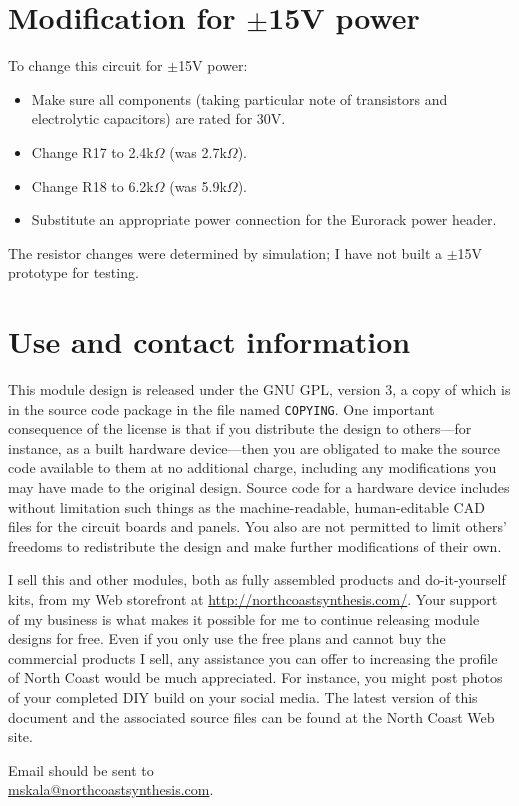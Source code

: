 \section{Modification for $\pm$15V power}

To change this circuit for $\pm$15V power:

\begin{itemize}
  \item Make sure all components (taking particular note of transistors
  and electrolytic capacitors) are rated for 30V.
  \item Change R17 to 2.4k$\Omega$ (was 2.7k$\Omega$).
  \item Change R18 to 6.2k$\Omega$ (was 5.9k$\Omega$).
  \item Substitute an appropriate power connection for the Eurorack power
  header.
\end{itemize}

The resistor changes were determined by simulation; I have not built a
$\pm$15V prototype for testing.

\section{Use and contact information}

This module design is released under the GNU GPL, version 3, a copy of which
is in the source code package in the file named \texttt{COPYING}.  One
important consequence of the license is that if you distribute the design to
others---for instance, as a built hardware device---then you are obligated
to make the source code available to them at no additional charge, including
any modifications you may have made to the original design.  Source code for
a hardware device includes without limitation such things as the
machine-readable, human-editable CAD files for the circuit boards and
panels.  You also are not permitted to limit others' freedoms to
redistribute the design and make further modifications of their own.

I sell this and other modules, both as fully assembled products and
do-it-yourself kits, from my Web storefront at
\url{http://northcoastsynthesis.com/}.  Your support of my business is what
makes it possible for me to continue releasing module designs for free. 
Even if you only use the free plans and cannot buy the commercial products I
sell, any assistance you can offer to increasing the profile of North Coast
would be much appreciated.  For instance, you might post photos of your
completed DIY build on your social media.  The latest version of this
document and the associated source files can be found at the North Coast Web
site.

Email should be sent to\\ \url{mskala@northcoastsynthesis.com}.
